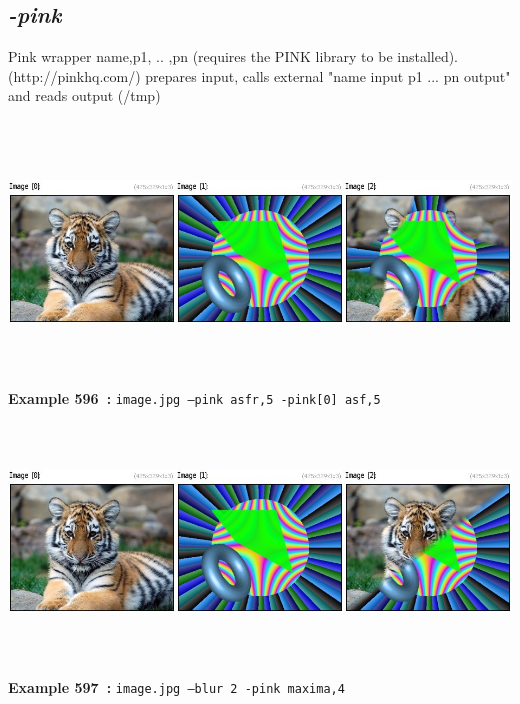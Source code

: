 \documentclass[a4paper,11pt,twoside]{book}
\begin{document}
\subsection{\emph{-pink} }\vspace*{-0.5em}
Pink wrapper name,p1, .. ,pn (requires the PINK library to be installed).
~\\(http://pinkhq.com/)
prepares input, calls external "name input p1 ... pn output" and reads output (/tmp)
\begin{center}\includegraphics[keepaspectratio=true,height=7cm,width=\textwidth]{img/gmic_def596.jpg}\\
{\footnotesize \textbf{Example 596~:} \texttt{image.jpg --pink asfr,5 -pink[0] asf,5}}
\\\includegraphics[keepaspectratio=true,height=7cm,width=\textwidth]{img/gmic_def597.jpg}\\
{\footnotesize \textbf{Example 597~:} \texttt{image.jpg --blur 2 -pink maxima,4}}
\end{center}
\end{document}

